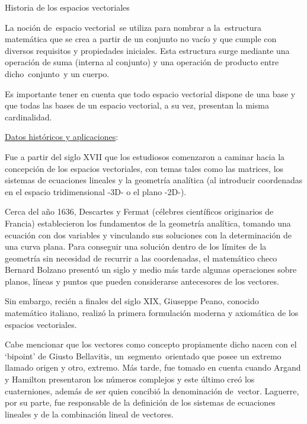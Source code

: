 \begin{myexampleblock}{Historia de los espacios vectoriales}

La noción de espacio vectorial se utiliza para nombrar a la estructura matemática que se crea a partir de un conjunto no vacío y que cumple con diversos requisitos y propiedades iniciales. Esta estructura surge mediante una operación de suma (interna al conjunto) y una operación de producto entre dicho conjunto y un cuerpo.

\vspace{2mm} Es importante tener en cuenta que todo espacio vectorial dispone de una base y que todas las bases de un espacio vectorial, a su vez, presentan la misma cardinalidad.

\vspace{2mm} \underline{Datos históricos y aplicaciones}:

\vspace{2mm} Fue a partir del siglo XVII que los estudiosos comenzaron a caminar hacia la concepción de los espacios vectoriales, con temas tales como las matrices, los sistemas de ecuaciones lineales y la geometría analítica (al introducir coordenadas en el espacio tridimensional -3D- o el plano -2D-).

\vspace{2mm} Cerca del año 1636, Descartes y Fermat (célebres científicos originarios de Francia) establecieron los fundamentos de la geometría analítica, tomando una ecuación con dos variables y vinculando sus soluciones con la determinación de una curva plana. Para conseguir una solución dentro de los límites de la geometría sin necesidad de recurrir a las coordenadas, el matemático checo Bernard Bolzano presentó un siglo y medio más tarde algunas operaciones sobre planos, líneas y puntos que pueden considerarse antecesores de los vectores.

\vspace{2mm} Sin embargo, recién a finales del siglo XIX, Giuseppe Peano, conocido matemático italiano, realizó la primera formulación moderna y axiomática de los espacios vectoriales. 

\vspace{2mm} Cabe mencionar que los vectores como concepto propiamente dicho nacen con el `bipoint’ de Giusto Bellavitis, un segmento orientado que posee un extremo llamado origen y otro, extremo. Más tarde, fue tomado en cuenta cuando Argand y Hamilton presentaron los números complejos y este último creó los cuaterniones, además de ser quien concibió la denominación de vector. Laguerre, por su parte, fue responsable de la definición de los sistemas de ecuaciones lineales y de la combinación lineal de vectores.


\end{myexampleblock}
